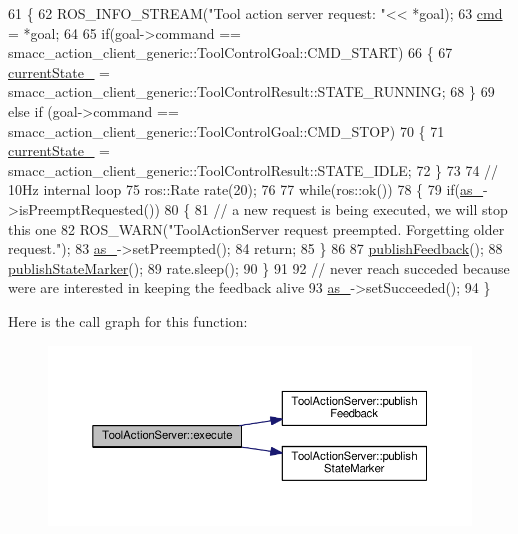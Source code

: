 \begin{DoxyCode}
61 \{
62   ROS\_INFO\_STREAM(\textcolor{stringliteral}{"Tool action server request: "}<< *goal);
63   \hyperlink{classToolActionServer_ad2320c18b9cf85de44f77e9815368902}{cmd} = *goal;
64 
65   \textcolor{keywordflow}{if}(goal->command == smacc\_action\_client\_generic::ToolControlGoal::CMD\_START)
66   \{
67     \hyperlink{classToolActionServer_aac4862d8c313b07e8506eb0c74507fb1}{currentState\_} =  smacc\_action\_client\_generic::ToolControlResult::STATE\_RUNNING;
68   \}
69   \textcolor{keywordflow}{else}  \textcolor{keywordflow}{if} (goal->command == smacc\_action\_client\_generic::ToolControlGoal::CMD\_STOP)
70   \{
71     \hyperlink{classToolActionServer_aac4862d8c313b07e8506eb0c74507fb1}{currentState\_} =  smacc\_action\_client\_generic::ToolControlResult::STATE\_IDLE;
72   \}
73 
74   \textcolor{comment}{// 10Hz internal loop}
75   ros::Rate rate(20);
76 
77   \textcolor{keywordflow}{while}(ros::ok())
78   \{
79     \textcolor{keywordflow}{if}(\hyperlink{classToolActionServer_a2b90828292eb25a69449de1e67a173d6}{as\_}->isPreemptRequested())
80     \{
81        \textcolor{comment}{// a new request is being executed, we will stop this one}
82        ROS\_WARN(\textcolor{stringliteral}{"ToolActionServer request preempted. Forgetting older request."});
83        \hyperlink{classToolActionServer_a2b90828292eb25a69449de1e67a173d6}{as\_}->setPreempted(); 
84        \textcolor{keywordflow}{return};
85     \}
86     
87     \hyperlink{classToolActionServer_afe566312095ca250bc32f98a11774f2b}{publishFeedback}();
88     \hyperlink{classToolActionServer_aef01c70e358c933855db3a37b46a3740}{publishStateMarker}();
89     rate.sleep();
90   \}
91 
92    \textcolor{comment}{// never reach succeded because were are interested in keeping the feedback alive}
93    \hyperlink{classToolActionServer_a2b90828292eb25a69449de1e67a173d6}{as\_}->setSucceeded();
94 \}
\end{DoxyCode}


Here is the call graph for this function\+:
\nopagebreak
\begin{figure}[H]
\begin{center}
\leavevmode
\includegraphics[width=350pt]{classToolActionServer_a34bd6fce77510778d5a51385afeb36bb_cgraph}
\end{center}
\end{figure}




